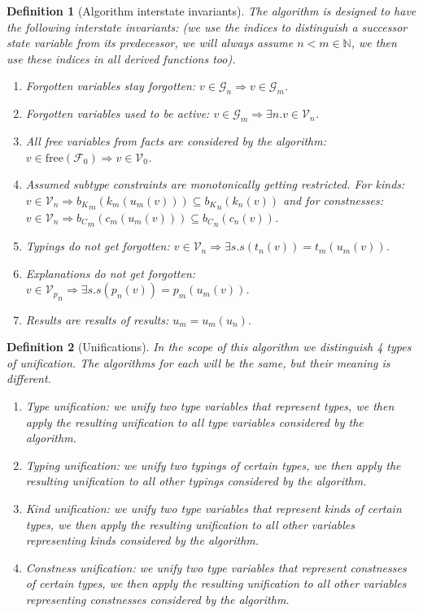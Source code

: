 \documentclass[12pt,a4paper]{article}
\newtheorem{definition}{Definition}
\begin{document}
\begin{definition}[Algorithm interstate invariants]
    The algorithm is designed to have the following interstate invariants: (we use the indices to distinguish a successor state variable from its predecessor, we will always assume $n < m \in \mathbb{N}$, we then use these indices in all derived functions too).

    \begin{enumerate}
        \item Forgotten variables stay forgotten: $v \in \mathcal{G}_n \Rightarrow v \in \mathcal{G}_m$.
        \item Forgotten variables used to be active: $v \in \mathcal{G}_m \Rightarrow \exists n . v \in \mathcal{V}_n$.
        \item All free variables from facts are considered by the algorithm: $v \in \mathrm{free} (\mathcal{F}_0) \Rightarrow v \in \mathcal{V}_0$.
        \item Assumed subtype constraints are monotonically getting restricted. For kinds: $v \in {\mathcal{V}}_n \Rightarrow {b_K}_m (k_m(u_m(v))) \subseteq {b_K}_n (k_n(v))$ and for constnesses: $v \in {\mathcal{V}}_n \Rightarrow {b_C}_m (c_m(u_m(v))) \subseteq {b_C}_n (c_n(v))$.
        \item Typings do not get forgotten: $v \in {\mathcal{V}}_n \Rightarrow \exists s . s(t_n(v)) = t_m(u_m (v))$.
        \item Explanations do not get forgotten: $v \in {\mathcal{V}_p}_n \Rightarrow \exists s . s(p_n(v)) = p_m(u_m (v))$.
        \item Results are results of results: $u_m = u_m (u_n)$.
    \end{enumerate}
\end{definition}

\begin{definition}[Unifications]
    In the scope of this algorithm we distinguish 4 types of unification. The algorithms for each will be the same, but their meaning is different.

    \begin{enumerate}
        \item Type unification: we unify two type variables that represent types, we then apply the resulting unification to all type variables considered by the algorithm. \label{tUni}
        \item Typing unification: we unify two typings of certain types, we then apply the resulting unification to all other typings considered by the algorithm.
        \item Kind unification: we unify two type variables that represent kinds of certain types, we then apply the resulting unification to all other variables representing kinds considered by the algorithm. \label{kUni}
        \item Constness unification: we unify two type variables that represent constnesses of certain types, we then apply the resulting unification to all other variables representing constnesses considered by the algorithm. \label{cUni} 
    \end{enumerate}
\end{definition}
\end{document}
